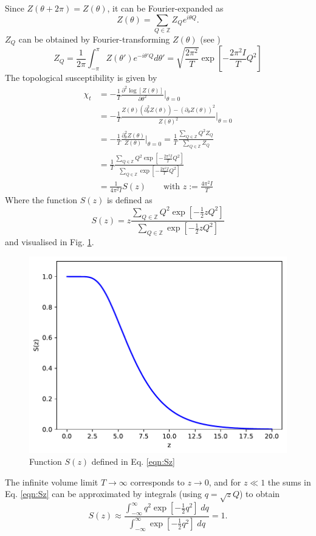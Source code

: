 \documentclass[11pt]{article}
\begin{document}
Since $Z(\theta+2\pi)=Z(\theta)$, it can be Fourier-expanded as
\begin{equation}
  Z(\theta)=\sum_{Q\in\mathbb{Z}} Z_Q e^{i\theta Q}.
\end{equation}
$Z_Q$ can be obtained by Fourier-transforming $Z(\theta)$ (see \cite{Bietenholz1997})
\begin{equation}
  Z_Q = \frac{1}{2\pi}\int_{-\pi}^{\pi} Z(\theta')e^{-i\theta'Q}d\theta'
  = \sqrt{\frac{2\pi^2}{T}}\exp\left[-\frac{2\pi^2I}{T}Q^2\right]
\end{equation}
The topological susceptibility is given by
\begin{equation}
  \begin{aligned}
    \chi_t &= -\frac{1}{T}\frac{\partial^2\log[Z(\theta)]}{\partial\theta^2}\Big\vert_{\theta=0}\\
    &= -\frac{1}{T}\frac{Z(\theta)(\partial^2_\theta Z(\theta))-(\partial_\theta Z(\theta))^2}{Z(\theta)^2}\Big\vert_{\theta=0}\\
    &= -\frac{1}{T}\frac{\partial^2_\theta Z(\theta)}{Z(\theta)}\Big\vert_{\theta=0}
    = \frac{1}{T}\frac{\sum_{Q\in\mathbb{Z}} Q^2 Z_Q}{\sum_{Q\in\mathbb{Z}}Z_Q}\\
    &= \frac{1}{T}\frac{\sum_{Q\in\mathbb{Z}} Q^2 \exp\left[-\frac{2\pi^2I}{T}Q^2\right]}{\sum_{Q\in\mathbb{Z}}\exp\left[-\frac{2\pi^2I}{T}Q^2\right]}\\
    &= \frac{1}{4\pi^2 I} S(z)\qquad\text{with $z:=\frac{4\pi^2 I}{T}$}
      \end{aligned}
\end{equation}
Where the function $S(z)$ is defined as
\begin{equation}
  S(z) = z \frac{\sum_{Q\in\mathbb{Z}}Q^2 \exp\left[-\frac{1}{2}zQ^2\right]}{\sum_{Q\in\mathbb{Z}}\exp\left[-\frac{1}{2}zQ^2\right]}\label{eqn:Sz}
\end{equation}
and visualised in Fig. \ref{fig:Splot}.
\begin{figure}
  \begin{center}
    \includegraphics[width=0.5\linewidth]{S.pdf}
    \caption{Function $S(z)$ defined in Eq. \eqref{eqn:Sz}}
    \label{fig:Splot}
  \end{center}
\end{figure}
The infinite volume limit $T\rightarrow\infty$ corresponds to $z\rightarrow 0$, and for $z\ll 1$ the sums in Eq. \eqref{eqn:Sz} can be approximated by integrals (using $q=\sqrt{z}Q$) to obtain
\begin{equation}
  S(z) \approx \frac{\int_{-\infty}^\infty q^2 \exp\left[-\frac{1}{2}q^2\right]\;dq}{\int_{-\infty}^\infty \exp\left[-\frac{1}{2}q^2\right]\;dq}=1.
\end{equation}


\end{document}
